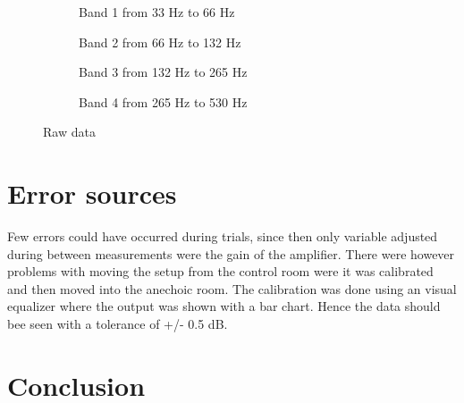 \begin{figure}[H]
\centering
\begin{subfigure}[t]{0.45\textwidth}
    \centering
    
    \caption{Band 1 from 33 Hz to 66 Hz}
    \label{fig:Band1Model}
\end{subfigure}
\begin{subfigure}[t]{0.45\textwidth}
    \centering
    
    \caption{Band 2 from 66 Hz to 132 Hz}
    \label{fig:Band2Model}
\end{subfigure}
\begin{subfigure}[t]{0.45\textwidth}
    \centering
    
    \caption{Band 3 from 132 Hz to 265 Hz}
    \label{fig:Band3Model}
\end{subfigure}
\begin{subfigure}[t]{0.45\textwidth}
    \centering
    
    \caption{Band 4 from 265 Hz to 530 Hz}
    \label{fig:Band4Model}
\end{subfigure}
\caption{Raw data}
\label{fig:THDComparisson}
\end{figure} 




\section{Error sources}
Few errors could have occurred during trials, since then only variable adjusted during between measurements were the gain of the amplifier. There were however problems with moving the setup from the control room were it was calibrated and then moved into the anechoic room. The
calibration was done using an visual equalizer where the output was shown with a bar chart. Hence the data should bee seen with a tolerance of +/- 0.5 dB.

\section{Conclusion}


